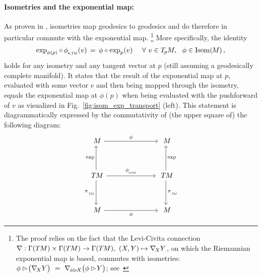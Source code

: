 \paragraph{Isometries and the exponential map:}
As proven in \cite{gallier2019diffgeom1}, isometries map geodesics to geodesics and do therefore in particular commute with the exponential map.%
\footnote{\label{footnote:LeviCivita_isometry_invariance}
    The proof relies on the fact that the Levi-Civita connection $\nabla: \Gamma(T\mkern-1.5muM) \times \Gamma(T\mkern-1.5muM) \to \Gamma(T\mkern-1.5muM),\ (X,Y)\mapsto \nabla_{\!X}Y$, on which the Riemannian exponential map is based, commutes with isometries:
    $\phi\rhd\! \big( \nabla_{\!X}Y \big) \ =\ \nabla_{\mkern-2mu\phi\rhd\! X} \big(\phi\rhd\! Y\big)$;
    see~\cite{gallier2019diffgeom1}
}
More specifically, the identity
\begin{align}\label{eq:exp_isom_commutation}
    \exp_{\phi(p)} \circ\, \dphiTM (v) \,=\, \phi \circ \exp_p(v) \quad\ \forall\ v\in \TpM,\ \ \phi\in \IsomM \,,
\end{align}
holds for any isometry and any tangent vector at $p$ (still assuming a geodesically complete manifold).
It states that the result of the exponential map at $p$, evaluated with some vector $v$ and then being mapped through the isometry, equals the exponential map at $\phi(p)$ when being evaluated with the pushforward of $v$ as visualized in Fig.~\ref{fig:isom_exp_transport} (left).
This statement is diagrammatically expressed by the commutativity of (the upper square of) the following diagram:
\begin{equation}
\begin{tikzcd}[column sep=70pt, row sep=35, font=\normalsize]
    M
        \arrow[r, "\phi"]
    &
    M
    \\
    \TM
        \arrow[r, "\dphiTM"]
        \arrow[d, "\piTM"']
        \arrow[u, "\exp"]
    &
    \TM
        \arrow[d, "\piTM"]
        \arrow[u, "\exp"']
    \\
    M
        \arrow[r, "\phi"']
    &
    M
\end{tikzcd}
\end{equation}


